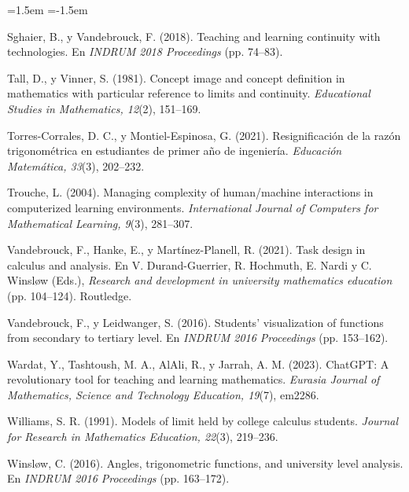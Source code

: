 \documentclass[11pt,letterpaper]{article}
\begin{document}
\begin{list}{}{\leftmargin=1.5em \itemindent=-1.5em \itemsep=3pt \parsep=0pt}
\item Sghaier, B., y Vandebrouck, F. (2018). Teaching and learning continuity with technologies. En \emph{INDRUM 2018 Proceedings} (pp. 74--83).
\item Tall, D., y Vinner, S. (1981). Concept image and concept definition in mathematics with particular reference to limits and continuity. \emph{Educational Studies in Mathematics, 12}(2), 151--169.
\item Torres-Corrales, D. C., y Montiel-Espinosa, G. (2021). Resignificación de la razón trigonométrica en estudiantes de primer año de ingeniería. \emph{Educación Matemática, 33}(3), 202--232.
\item Trouche, L. (2004). Managing complexity of human/machine interactions in computerized learning environments. \emph{International Journal of Computers for Mathematical Learning, 9}(3), 281--307.
\item Vandebrouck, F., Hanke, E., y Martínez-Planell, R. (2021). Task design in calculus and analysis. En V. Durand-Guerrier, R. Hochmuth, E. Nardi y C. Winsløw (Eds.), \emph{Research and development in university mathematics education} (pp. 104--124). Routledge.
\item Vandebrouck, F., y Leidwanger, S. (2016). Students' visualization of functions from secondary to tertiary level. En \emph{INDRUM 2016 Proceedings} (pp. 153--162).
\item Wardat, Y., Tashtoush, M. A., AlAli, R., y Jarrah, A. M. (2023). ChatGPT: A revolutionary tool for teaching and learning mathematics. \emph{Eurasia Journal of Mathematics, Science and Technology Education, 19}(7), em2286.
\item Williams, S. R. (1991). Models of limit held by college calculus students. \emph{Journal for Research in Mathematics Education, 22}(3), 219--236.
\item Winsløw, C. (2016). Angles, trigonometric functions, and university level analysis. En \emph{INDRUM 2016 Proceedings} (pp. 163--172).
\end{list}
\end{document}
